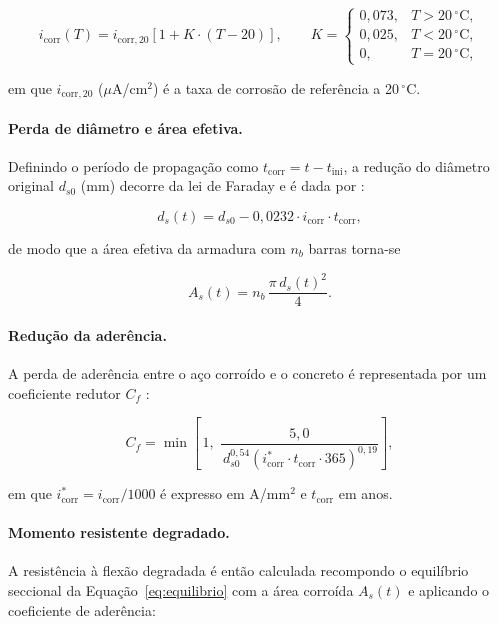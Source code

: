 \begin{equation}\label{eq:i_cor_t}
i_{\mathrm{corr}}(T) = i_{\mathrm{corr},20} \left[ 1 + K \cdot (T - 20) \right],
\qquad
K =
\begin{cases}
0{,}073, & T > 20\,^\circ\mathrm{C}, \\
0{,}025, & T < 20\,^\circ\mathrm{C}, \\
0, & T = 20\,^\circ\mathrm{C},
\end{cases}
\end{equation}

\noindent em que $i_{\mathrm{corr},20}$ ($\mu$A/cm$^2$) é a taxa de corrosão de referência a 20\,$^\circ$C.

\paragraph{Perda de di\^ametro e \'area efetiva.}
Definindo o período de propagação como $t_{\mathrm{corr}} = t - t_{\mathrm{ini}}$, a redução do diâmetro original $d_{s0}$ (mm) decorre da lei de Faraday e é dada por \parencite{val1997, azad2010}:

\begin{equation}\label{eq:d_cor}
d_{s}(t) = d_{s0} - 0{,}0232 \cdot i_{\mathrm{corr}} \cdot t_{\mathrm{corr}},
\end{equation}

\noindent de modo que a área efetiva da armadura com $n_b$ barras torna-se

\begin{equation}\label{eq:as_t}
A_{s}(t) = n_b\, \frac{\pi\, d_{s}(t)^2}{4}.
\end{equation}

\paragraph{Redu\c{c}\~ao da ader\^encia.}
A perda de aderência entre o aço corroído e o concreto é representada por um coeficiente redutor $C_f$ \parencite{azad2010}:

\begin{equation}\label{eq:c_f}
C_f = \min\!\left[\,1,\; \frac{5{,}0}{\, d_{s0}^{0{,}54} \left( i^{*}_{\mathrm{corr}} \cdot t_{\mathrm{corr}} \cdot 365 \right)^{0{,}19}}\right],
\end{equation}

\noindent em que $i^{*}_{\mathrm{corr}} = i_{\mathrm{corr}}/1000$ é expresso em A/mm$^2$ e $t_{\mathrm{corr}}$ em anos.

\paragraph{Momento resistente degradado.}
A resistência à flexão degradada é então calculada recompondo o equilíbrio seccional da Equação~\eqref{eq:equilibrio} com a área corroída $A_s(t)$ e aplicando o coeficiente de aderência:

